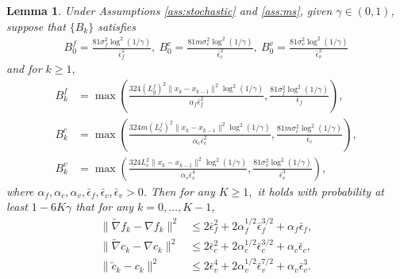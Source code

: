 \documentclass[11pt]{article}
\newcommand{\be}{\begin{equation}}
\newcommand{\ee}{\end{equation}}
\newtheorem{lemma}{Lemma}
\begin{document}
\begin{lemma}\label{lem:gradient_estimator_recursive_lemma}
Under Assumptions \ref{ass:stochastic} and \ref{ass:ms}, given \(\gamma \in (0,1)\), suppose that $\{B_k\}$ satisfies 
\begin{align}\label{rm_b0}
    B_0^f =  \frac{81\sigma_f^2\log^2(1 /\gamma)}{\bar \epsilon_f^2},~ B_0^c =  \frac{{81m\sigma_c^2\log^2(1 /\gamma)}}{\bar \epsilon_c^2},~ B_0^v =  \frac{81\sigma_v^2\log^2(1 /\gamma)}{\bar \epsilon_v^2} 
\end{align}
and for $k\ge1,$
\be\label{batch-rm}\begin{aligned}
    B_k^f &= \max \left(\frac{324(L_g^f)^2\|x_k - x_{k-1}\|^2\log^2(1/\gamma)}{\alpha_f\bar \epsilon_f^2},\frac{81\sigma_f^2\log^2(1/\gamma)}{\bar \epsilon_f}\right) , \\
    B_k^c &= \max \left(\frac{{324 m (L_c^f)^2\|x_k - x_{k-1}\|^2\log^2(1/\gamma)}}{\alpha_c\bar \epsilon_c^2},\frac{{81m\sigma_c^2\log^2(1/\gamma)}}{\bar \epsilon_c}\right) , \\
    B_k^v &= \max \left(\frac{324 L_c^2\|x_k - x_{k-1}\|^2\log^2(1/\gamma)}{\alpha_v\bar \epsilon_v^4},\frac{81\sigma_v^2\log^2(1/\gamma)}{\bar \epsilon_v^3}\right) ,
\end{aligned}\ee
where $\alpha_f,\alpha_c,\alpha_v,\bar \epsilon_f,\bar \epsilon_c,\bar \epsilon_v>0$. Then for any $K\ge 1,$ it holds with probability at least $1-6K\gamma$ that for any \(k=0,\ldots, K-1\),
    \be\label{hig-err}\begin{aligned}
        \|\tilde \nabla f_k - \nabla f_k\|^2 &\leq 2\bar \epsilon_f^2+2\alpha_f^{1/2}\bar \epsilon_f^{3/2}+\alpha_f\bar \epsilon_f,\\
        \|\tilde \nabla c_k - \nabla c_k\|^2 &\leq 2\bar \epsilon_c^2+2\alpha_c^{1/2}\bar \epsilon_c^{3/2}+\alpha_c\bar \epsilon_c,\\
        \|\tilde c_k - c_k\|^2 &\leq 2\bar \epsilon_v^4+2\alpha_v^{1/2}\bar \epsilon_v^{7/2}+\alpha_v\bar \epsilon_v^3.
    \end{aligned}\ee
\end{lemma}
\end{document}
